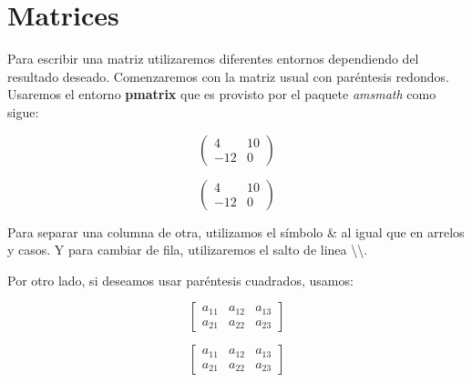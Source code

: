 \documentclass[graybox,envcountchap,sectrefs]{svmono}
\begin{document}
\section{Matrices}
Para escribir una matriz utilizaremos diferentes entornos dependiendo del resultado deseado.
Comenzaremos con la matriz usual con paréntesis redondos. Usaremos el entorno \textbf{pmatrix} que es provisto por el paquete \emph{amsmath}
como sigue:\
\begin{code}
    \[
    \begin{pmatrix}
        4   &   10  \\
        -12 &   0
    \end{pmatrix}\]
\end{code}
\begin{compiled}
    \[
    \begin{pmatrix}
        4   &   10  \\
        -12 &   0
    \end{pmatrix}\]
\end{compiled}
Para separar una columna de otra, utilizamos el símbolo \& al igual que en arrelos y casos.
Y para cambiar de fila, utilizaremos el salto de linea \textbackslash\textbackslash.

Por otro lado, si deseamos usar paréntesis cuadrados, usamos:

\begin{code}
    \[
        \begin{bmatrix}
            a_{11} &   a_{12} & a_{13}   \\
            a_{21} &   a_{22} & a_{23} 
        \end{bmatrix}
    \]
\end{code}
\begin{compiled}
    \[
        \begin{bmatrix}
            a_{11} &   a_{12} & a_{13}   \\
            a_{21} &   a_{22} & a_{23} 
        \end{bmatrix}
    \]
\end{compiled}
\end{document}
